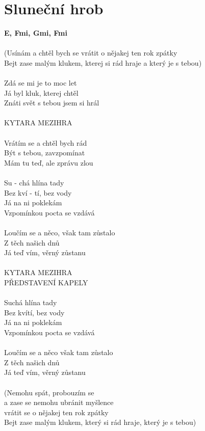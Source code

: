 \section{Sluneční hrob}
\footnotesize\textbf{E, F\kr mi\7, G\kr mi\6, F\kr mi\7} \\
\normalsize
\\
(Usínám a chtěl bych se vrátit o nějakej ten rok zpátky\\
Bejt zase malým klukem, kterej si rád hraje a který je s tebou)\\
\\
Zdá se mi je to moc let\\
Já byl kluk, kterej chtěl\\
Znáti svět s tebou jsem si hrál\\
\\
KYTARA MEZIHRA\\
\\
Vrátím se a chtěl bych rád\\
Být s tebou, zavzpomínat\\
Mám tu teď, ale zprávu zlou\\
\\
 Su - chá hlína tady\\
 Bez kví - tí, bez vody\\
Já na ni poklekám\\
Vzpomínkou pocta se vzdává\\
\\
Loučím se a něco, však tam zůstalo\\
Z těch našich dnů\\
Já teď vím, věrný zůstanu\\
\\
KYTARA MEZIHRA\\
PŘEDSTAVENÍ KAPELY\\
\\
Suchá hlína tady\\
Bez kvítí, bez vody\\
Já na ni poklekám\\
Vzpomínkou pocta se vzdává\\
\\
Loučím se a něco však tam zůstalo\\
Z těch našich dnů\\
Já teď vím, věrný zůstanu\\
\\
(Nemohu spát, probouzím se\\
a zase se nemohu ubránit myšlence\\
vrátit se o nějakej ten rok zpátky\\
Bejt zase malým klukem, který si rád hraje, který je s tebou)\\